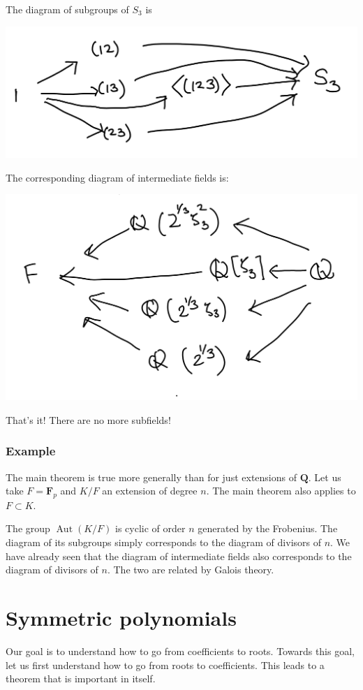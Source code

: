 \documentclass[11pt]{article}
\begin{document}
The diagram of subgroups of \(S_3\) is
\begin{center}
\includegraphics[width=.9\linewidth]{assets/Course_notes/2023-04-18_13-53-10_screenshot.png}
\end{center}
The corresponding diagram of intermediate fields is:

\begin{center}
\includegraphics[width=.9\linewidth]{assets/Course_notes/2023-04-18_13-55-04_screenshot.png}
\end{center}
That's it!  There are no more subfields!
\subsubsection{Example}
\label{sec:orga307a32}
The main theorem is true more generally than for just extensions of \(\mathbf{Q}\).
Let us take \(F = \mathbf{F}_p\) and \(K / F\) an extension of degree \(n\).
The main theorem also applies to \(F \subset K\).

The group \(\operatorname{Aut}(K/F)\) is cyclic of order \(n\) generated by the Frobenius.
The diagram of its subgroups simply corresponds to the diagram of divisors of \(n\).
We have already seen that the diagram of intermediate fields also corresponds to the diagram of divisors of \(n\).
The two are related by Galois theory.
\section{Symmetric polynomials}
\label{sec:org612a53c}
Our goal is to understand how to go from coefficients to roots.
Towards this goal, let us first understand how to go from roots to coefficients.
This leads to a theorem that is important in itself.
\end{document}
